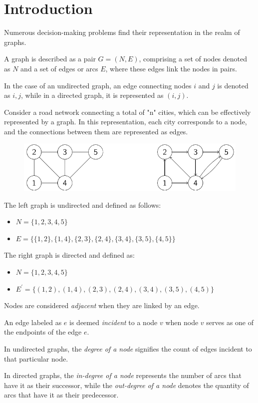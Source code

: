\section{Introduction}

Numerous decision-making problems find their representation in the realm of graphs.
\begin{definition}
    A graph is described as a pair $G=(N,E)$, comprising a set of nodes denoted as $N$ and a set of edges or arcs $E$, where these edges link the nodes in pairs.

    In the case of an undirected graph, an edge connecting nodes $i$ and $j$ is denoted as ${i,j}$, while in a directed graph, it is represented as $(i,j)$.    
\end{definition}
\begin{example}
    Consider a road network connecting a total of "n" cities, which can be effectively represented by a graph. 
    In this representation, each city corresponds to a node, and the connections between them are represented as edges.        
    \begin{figure}[H]
        \centering
        \includegraphics[width=0.75\linewidth]{images/graph.png}
    \end{figure}
    The left graph is undirected and defined as follows:
    \begin{itemize}
        \item $N=\{1,2,3,4,5\}$
        \item $E=\{\{1,2\},\{1,4\},\{2,3\},\{2,4\},\{3,4\},\{3,5\},\{4,5\}\}$
    \end{itemize}
    The right graph is directed and defined as:
    \begin{itemize}
        \item $N=\{1,2,3,4,5\}$
        \item $E^{'}=\{(1,2),(1,4),(2,3),(2,4),(3,4),(3,5),(4,5)\}$
    \end{itemize}
\end{example}
\newpage
\begin{definition}
    Nodes are considered \emph{adjacent} when they are linked by an edge.
    
    An edge labeled as $e$ is deemed \emph{incident} to a node $v$ when node $v$ serves as one of the endpoints of the edge $e$.
    
    In undirected graphs, the \emph{degree of a node} signifies the count of edges incident to that particular node. 
    
    In directed graphs, the \emph{in-degree of a node} represents the number of arcs that have it as their successor, while the \emph{out-degree of a node} denotes the quantity of arcs that have it as their predecessor.
\end{definition}

